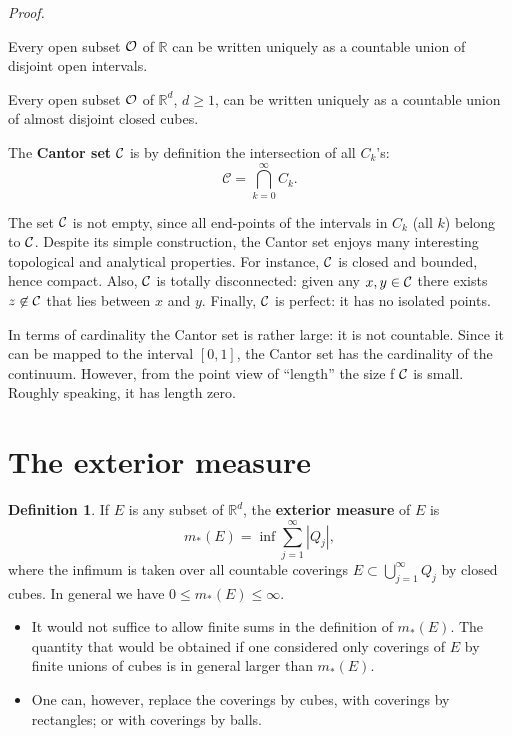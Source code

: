 \documentclass[
]{book}
\providecommand{\tightlist}{%
  \setlength{\itemsep}{0pt}\setlength{\parskip}{0pt}}
\theoremstyle{definition}
\newtheorem{definition}{Definition}[chapter]
\theoremstyle{definition}
\theoremstyle{definition}
\theoremstyle{definition}
\theoremstyle{remark}
\begin{document}
\emph{Proof.}

Every open subset \(\cal{O}\) of \(\mathbb{R}\) can be written uniquely as a countable union of disjoint open intervals.

Every open subset \(\cal{O}\) of \(\mathbb{R}^d\), \(d\geq 1\), can be written uniquely as a countable union of almost disjoint closed cubes.

The \textbf{Cantor set} \(\cal{C}\) is by definition the intersection of all \(C_k\)'s:
\[
\mathcal{C}=\bigcap_{k=0}^{\infty}C_k.
\]

The set \(\cal{C}\) is not empty, since all end-points of the intervals in \(C_k\) (all \(k\)) belong to \(\cal{C}\).
Despite its simple construction, the Cantor set enjoys many interesting topological and analytical properties. For instance, \(\cal{C}\) is closed and bounded, hence compact. Also, \(\cal{C}\) is totally disconnected: given any \(x,y\in \cal{C}\) there exists \(z\not\in \cal{C}\) that lies between \(x\) and \(y\). Finally, \(\cal{C}\) is perfect: it has no isolated points.

In terms of cardinality the Cantor set is rather large: it is not countable. Since it can be mapped to the interval \([0,1]\), the Cantor set has the cardinality of the continuum. However, from the point view of ``length'' the size f \(\cal C\) is small. Roughly speaking, it has length zero.

\section{The exterior measure}\label{the-exterior-measure}

\begin{definition}
If \(E\) is any subset of \(\mathbb{R}^d\), the \textbf{exterior measure} of \(E\) is
\[
m_{\ast}(E) = \inf\sum_{j=1}^{\infty}|Q_j|,
\]
where the infimum is taken over all countable coverings \(E\subset \bigcup_{j=1}^{\infty}Q_j\) by closed cubes. In general we have \(0\leq m_{\ast}(E)\leq \infty\).
\end{definition}

\begin{itemize}
\tightlist
\item
  It would not suffice to allow finite sums in the definition of \(m_{\ast}(E)\). The quantity that would be obtained if one considered only coverings of \(E\) by finite unions of cubes is in general larger than \(m_{\ast}(E)\).
\item
  One can, however, replace the coverings by cubes, with coverings by rectangles; or with coverings by balls.
\end{itemize}
\end{document}
